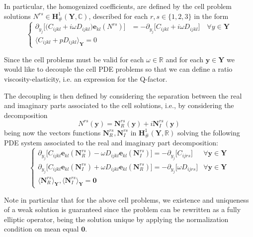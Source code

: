 In particular, the homogenized coefficients, are defined by the cell problem solutions $N^{rs} \in \mathbf{H}^1_{\#}(\mathbf{Y}, \mathbb{C})$, described for each $r,s \in \{1,2,3\}$ in the form
\begin{equation*}
    \left \{
    \begin{array}{cc}
         \partial_{y_j} \big[ \big( C_{ijkl} + i\omega D_{ijkl} \big) \mathbf{e}_{kl}(N^{rs}) \big] &= - \partial_{y_j} \big[ C_{ijkl} + i\omega D_{ijkl} \big] \quad \forall y \in \mathbf{Y} \\
        \big \langle C_{ijkl} + p D_{ijkl} \big \rangle_{\mathbf{Y}}  = 0 & 
    \end{array}
    \right.
\end{equation*}
\begin{rem}
Since the cell problems must be valid for each $\omega \in \mathbb{R}$ and for each $\mathbf{y} \in \mathbf{Y}$ we would like to decouple the cell PDE problems so that we can define a ratio viscosity-elasticity, i.e. an expression for the Q-factor.
\end{rem}
The decoupling is then defined by considering the separation between the real and imaginary parts associated to the cell solutions, i.e., by considering the decomposition
\begin{equation*}
    N^{rs}(\mathbf{y}) = \mathbf{N}_R^{rs}(\mathbf{y}) + i\mathbf{N}_I^{rs}(\mathbf{y})
\end{equation*}
being now the vectors functions $\mathbf{N}_R^{rs}, \mathbf{N}_I^{rs}$ in $\mathbf{H}^1_{\#}(\mathbf{Y},\mathbb{R})$ solving the following PDE system associated to the real and imaginary part decomposition:
\begin{equation*}
    \left \{
    \begin{array}{cc}
        \partial_{y_j} \big[ C_{ijkl} \mathbf{e}_{kl}(\mathbf{N}^{rs}_R) -\omega D_{ijkl} \mathbf{e}_{kl}(\mathbf{N}^{rs}_I) \big] = - \partial_{y_j} \big[ C_{ijrs} \big] & \forall \mathbf{y} \in \mathbf{Y} \\
        \partial_{y_j} \big[ C_{ijkl} \mathbf{e}_{kl}(\mathbf{N}^{rs}_I) +\omega D_{ijkl} \mathbf{e}_{kl}(\mathbf{N}^{rs}_R) \big] = - \partial_{y_j} \big[ \omega D_{ijrs} \big] & \forall \mathbf{y} \in \mathbf{Y} \\
        \big \langle \mathbf{N}^{rs}_R \big \rangle_{\mathbf{Y}},\big \langle \mathbf{N}^{rs}_I \big \rangle_{\mathbf{Y}} = \mathbf{0}  &
    \end{array}
    \right.
\end{equation*}
\begin{rem}
Note in particular that for the above cell problems, we existence and uniqueness of a weak solution is guaranteed since the problem can be rewritten as a fully elliptic operator, being the solution unique by applying the normalization condition on mean equal $\mathbf{0}$.
\end{rem}
